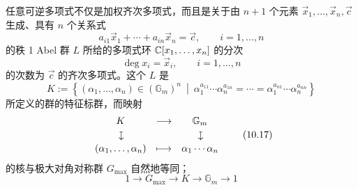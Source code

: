 任意可逆多项式不仅是加权齐次多项式，而且是关于由 $n+1$ 个元素 $\vec x_1,\ldots,\vec x_n,\vec c$ 生成、具有 $n$ 个关系式
\begin{equation}
    a_{i1}\vec x_1+\cdots+a_{in}\vec x_n=\vec c,\qquad i=1,\ldots,n \tag{10.14}
\end{equation}
的秩 1 Abel 群 $L$ 所给的多项式环 $\mathbb{C}[x_1,\ldots,x_n]$ 的分次
\begin{equation}
    \deg x_i=\vec x_i,\qquad i=1,\ldots,n \tag{10.15}
\end{equation}
的次数为 $\vec c$ 的齐次多项式。这个 $L$ 是
\begin{equation}
    K:=\left\{(\alpha_1,\ldots,\alpha_n)\in(\mathbb{G}_m)^{n}\ \middle|\ \alpha_1^{a_{11}}\cdots\alpha_n^{a_{1n}}=\cdots=\alpha_1^{a_{n1}}\cdots\alpha_n^{a_{nn}}\right\} \tag{10.16}
\end{equation}
所定义的群的特征标群，而映射
\begin{equation}
    \begin{array}{ccc}
        K & \longrightarrow & \mathbb{G}_m \\[2pt]
        \text{\rotatebox[origin=c]{-90}{$\mapsto$}} & & \text{\rotatebox[origin=c]{-90}{$\mapsto$}} \\[2pt]
        (\alpha_1,\ldots,\alpha_n) & \longmapsto & \alpha_1\cdots\alpha_n
    \end{array}
    \tag{10.17}
\end{equation}
的核与极大对角对称群 $G_{\max}$ 自然地等同；
\begin{equation}
    1\to G_{\max}\to K\to\mathbb{G}_m\to 1 \tag{10.18}
\end{equation}

